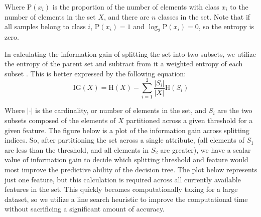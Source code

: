 Where $\mathrm{P}(x_i)$ is the proportion of the number of elements with class $x_i$ to the number of elements in the set $X$, and there are $n$ classes in the set. Note that if all samples belong to class $i$, $\mathrm{P}(x_i) = 1$ and $\log_2 \mathrm{P}(x_i) = 0$, so the entropy is zero. 

In calculating the information gain of splitting the set into two subsets, we utilize the entropy of the parent set and subtract from it a weighted entropy of each subset \cite{wiki:IG}. This is better expressed by the following equation:
%
\begin{equation}
  \mathrm{IG}(X) = \mathrm{H}(X) - \sum_{i=1}^{2} \frac{|S_i|}{|X|} \mathrm{H}(S_i)
\end{equation}

Where $|\cdot|$ is the cardinality, or number of elements in the set, and $S_i$ are the two subsets composed of the elements of $X$ partitioned across a given threshold for a given feature. The figure below is a plot of the information gain across splitting indices. So, after partitioning the set across a single attribute, (all elements of $S_1$ are less than the threshold, and all elements in $S_2$ are greater), we have a scalar value of information gain to decide which splitting threshold and feature would most improve the predictive ability of the decision tree. The plot below represents just one feature, but this calculation is required across all currently available features in the set. This quickly becomes computationally taxing for a large dataset, so we utilize a line search heuristic to improve the computational time without sacrificing a significant amount of accuracy. 

